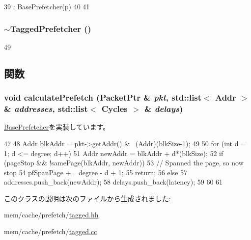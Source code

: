 \begin{DoxyCode}
39     : BasePrefetcher(p)
40 {
41 }
\end{DoxyCode}
\hypertarget{classTaggedPrefetcher_a37395794c36761f7764744f2cb6c388b}{
\subsubsection[{$\sim$TaggedPrefetcher}]{\setlength{\rightskip}{0pt plus 5cm}$\sim${\bf TaggedPrefetcher} ()}}
\label{classTaggedPrefetcher_a37395794c36761f7764744f2cb6c388b}



\begin{DoxyCode}
49 {}
\end{DoxyCode}


\subsection{関数}
\hypertarget{classTaggedPrefetcher_a1cc3d838a8314074cfda794f18eb6de9}{
\subsubsection[{calculatePrefetch}]{\setlength{\rightskip}{0pt plus 5cm}void calculatePrefetch ({\bf PacketPtr} \& {\em pkt}, \/  {\bf std::list}$<$ {\bf Addr} $>$ \& {\em addresses}, \/  {\bf std::list}$<$ {\bf Cycles} $>$ \& {\em delays})}}
\label{classTaggedPrefetcher_a1cc3d838a8314074cfda794f18eb6de9}


\hyperlink{classBasePrefetcher_a3db7131bcae7e87e8146195a6e8be817}{BasePrefetcher}を実装しています。


\begin{DoxyCode}
47 {
48     Addr blkAddr = pkt->getAddr() & ~(Addr)(blkSize-1);
49 
50     for (int d = 1; d <= degree; d++) {
51         Addr newAddr = blkAddr + d*(blkSize);
52         if (pageStop &&  !samePage(blkAddr, newAddr)) {
53             // Spanned the page, so now stop
54             pfSpanPage += degree - d + 1;
55             return;
56         } else {
57             addresses.push_back(newAddr);
58             delays.push_back(latency);
59         }
60     }
61 }
\end{DoxyCode}


このクラスの説明は次のファイルから生成されました:\begin{DoxyCompactItemize}
\item 
mem/cache/prefetch/\hyperlink{tagged_8hh}{tagged.hh}\item 
mem/cache/prefetch/\hyperlink{tagged_8cc}{tagged.cc}\end{DoxyCompactItemize}
